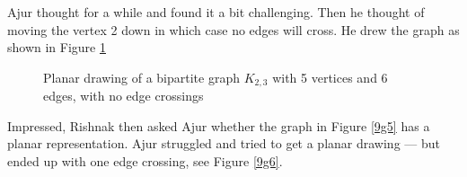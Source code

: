 Ajur thought for a while and found it a bit challenging. Then he thought of moving the vertex 2 down in which case no edges will cross. He drew the graph as shown in Figure \ref{9g4}
\begin{figure}
\begin{center}
\caption{ Planar drawing of a bipartite graph $K_{2,3}$ with 5 vertices and 6 edges, with no edge crossings}\label{9g4}
\end{center}
\end{figure}

Impressed, Rishnak then asked Ajur whether the graph in Figure \ref{9g5} has a planar representation. Ajur struggled and tried to get a planar drawing --- but ended up with one edge crossing, see Figure \ref{9g6}. 

